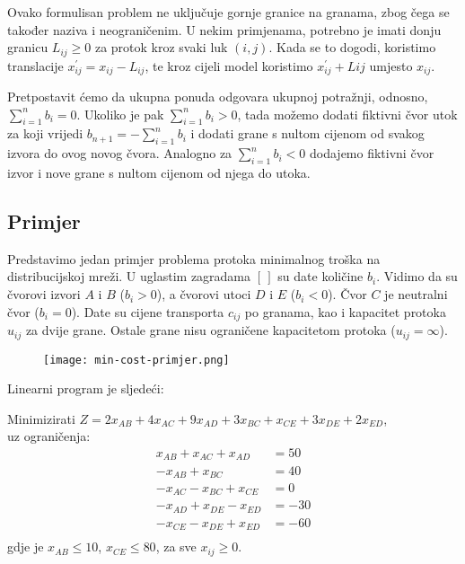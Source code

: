\documentclass[11pt, a4paper]{article}
\begin{document}
	Ovako formulisan problem ne uključuje gornje granice na granama, zbog čega se također naziva i neograničenim. U nekim primjenama, potrebno je imati donju granicu \( L_{ij} \geq 0 \) za protok kroz svaki luk \( (i,j) \). Kada se to dogodi, koristimo translacije \( x_{ij}^{\prime} = x_{ij} - L_{ij} \), te kroz cijeli model koristimo \( x_{ij}^{\prime} + L{ij} \) umjesto \( x_{ij} \).
	
	Pretpostavit ćemo da ukupna ponuda odgovara ukupnoj potražnji, odnosno, $\sum_{i=1}^{n} b_i = 0$. Ukoliko je pak $\sum_{i=1}^{n} b_i > 0$, tada možemo dodati fiktivni čvor utok za koji vrijedi $b_{n+1} = -\sum_{i=1}^{n} b_i$ i dodati grane s nultom cijenom od svakog izvora do ovog novog čvora. Analogno za $\sum_{i=1}^{n} b_i < 0$ dodajemo fiktivni čvor izvor i nove grane s nultom cijenom od njega do utoka.
	
	\subsection*{Primjer}
	
	Predstavimo jedan primjer problema protoka minimalnog troška na distribucijskoj mreži. U uglastim zagradama $[\,]$ su date količine $b_i$. Vidimo da su čvorovi izvori $A$ i $B$ ($b_i > 0$), a čvorovi utoci $D$ i $E$ ($b_i < 0$). Čvor $C$ je neutralni čvor ($b_i = 0$). Date su cijene transporta $c_{ij}$ po granama, kao i kapacitet protoka $u_{ij}$ za dvije grane. Ostale grane nisu ograničene kapacitetom protoka ($u_{ij} = \infty$).
	
		\begin{figure}[h]
		\centering
		\texttt{[image: min-cost-primjer.png]}
		\label{fig:min-cost-primjer}
	\end{figure}
	
	Linearni program je sljedeći:
	
	Minimizirati $Z = 2x_{AB} + 4x_{AC} + 9x_{AD} + 3x_{BC} + x_{CE} + 3x_{DE} + 2x_{ED}$,\\
	uz ograničenja:
	\begin{align*}
		x_{AB} + x_{AC} + x_{AD} &= 50 \\
		-x_{AB} + x_{BC} &= 40 \\
		-x_{AC} - x_{BC} + x_{CE} &= 0 \\
		-x_{AD} + x_{DE} - x_{ED} &= -30 \\
		-x_{CE} - x_{DE} + x_{ED} &= -60 \\
	\end{align*}
	gdje je $ x_{AB} \leq 10$, $ x_{CE} \leq 80$, za sve $ x_{ij} \geq 0$.
	
\end{document}
